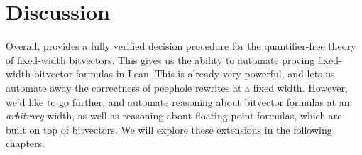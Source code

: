 \section{Discussion}

Overall, \bvdecide{} provides a fully verified decision procedure for the quantifier-free theory of fixed-width bitvectors.
This gives us the ability to automate proving fixed-width bitvector formulas in Lean.
This is already very powerful, and lets us automate away the correctness of peephole rewrites at a fixed width.
However, we'd like to go further, and automate reasoning about bitvector formulas at an \emph{arbitrary} width,
as well as reasoning about floating-point formulas, which are built on top of bitvectors.
We will explore these extensions in the following chapters.

